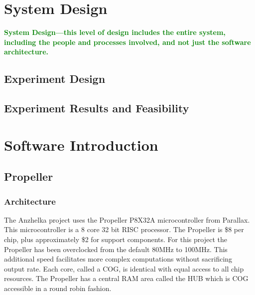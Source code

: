 \documentclass{article}
\numberwithin{equation}{section} %
\begin{document}
\section{System Design}
\textcolor{green}{\bf System Design—this level of design includes the entire system, including the people and processes involved, and not just the software architecture.}

\subsection{Experiment Design}

\subsection{Experiment Results and Feasibility}

\section{Software Introduction}

\subsection{Propeller}

\subsubsection{Architecture}

The Anzhelka project uses the Propeller P8X32A microcontroller from Parallax. This microcontroller is a 8 core 32 bit RISC processor. The Propeller is \$8 per chip, plus approximately \$2 for support components. For this project the Propeller has been overclocked from the default 80MHz to 100MHz. This additional speed facilitates more complex computations without sacrificing output rate. Each core, called a COG, is identical with equal access to all chip resources. The Propeller has a central RAM area called the HUB which is COG accessible in a round robin fashion.
\end{document}
